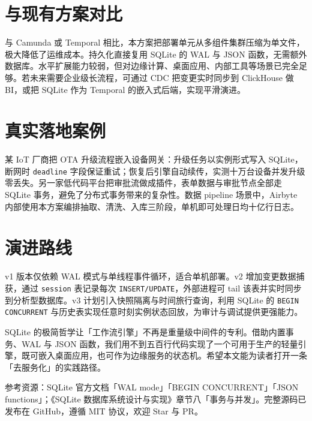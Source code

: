 \chapter{与现有方案对比}
与 Camunda 或 Temporal 相比，本方案把部署单元从多组件集群压缩为单文件，极大降低了运维成本。持久化直接复用 SQLite 的 WAL 与 JSON 函数，无需额外数据库。水平扩展能力较弱，但对边缘计算、桌面应用、内部工具等场景已完全足够。若未来需要企业级长流程，可通过 CDC 把变更实时同步到 ClickHouse 做 BI，或把 SQLite 作为 Temporal 的嵌入式后端，实现平滑演进。\par
\chapter{真实落地案例}
某 IoT 厂商把 OTA 升级流程嵌入设备网关：升级任务以实例形式写入 SQLite，断网时 \texttt{deadline} 字段保证重试；恢复后引擎自动续传，实测十万台设备并发升级零丢失。另一家低代码平台把审批流做成插件，表单数据与审批节点全部走 SQLite 事务，避免了分布式事务带来的复杂性。数据 pipeline 场景中，Airbyte 内部使用本方案编排抽取、清洗、入库三阶段，单机即可处理日均十亿行日志。\par
\chapter{演进路线}
v1 版本仅依赖 WAL 模式与单线程事件循环，适合单机部署。v2 增加变更数据捕获，通过 \texttt{session} 表记录每次 \texttt{INSERT/UPDATE}，外部进程可 tail 该表并实时同步到分析型数据库。v3 计划引入快照隔离与时间旅行查询，利用 SQLite 的 \texttt{BEGIN CONCURRENT} 与历史表实现任意时刻实例状态回放，为审计与调试提供更强能力。\par
SQLite 的极简哲学让「工作流引擎」不再是重量级中间件的专利。借助内置事务、WAL 与 JSON 函数，我们用不到五百行代码实现了一个可用于生产的轻量引擎，既可嵌入桌面应用，也可作为边缘服务的状态机。希望本文能为读者打开一条「去服务化」的实践路径。\par
参考资源：SQLite 官方文档「WAL mode」「BEGIN CONCURRENT」「JSON functions」；《SQLite 数据库系统设计与实现》章节八「事务与并发」。完整源码已发布在 GitHub，遵循 MIT 协议，欢迎 Star 与 PR。\par
